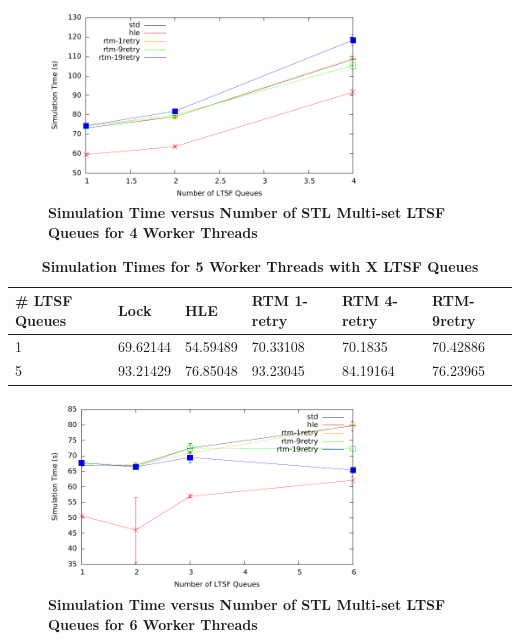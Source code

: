 \documentclass[11pt]{book}
\begin{document}
\begin{figure}[H]
    \centering
    \graphicspath{ {./figures/} }
    \includegraphics[width=0.75\textwidth,keepaspectratio]{noThrMig-hugeEpidemicSim-timeVSschedQs-multiset-4thread}
    \caption{\textbf{Simulation Time versus Number of STL Multi-set LTSF Queues
    for 4 Worker Threads}}
    \label{fig:noThrMig_timeVSschq_4threads}
\end{figure}

\begin{table}[H]
    \centering
    \begin{tabular}{l|p{2cm}|p{2cm}|p{2cm}|p{2cm}|p{2cm}}
        \textbf{\# LTSF Queues}&Lock &HLE &RTM 1-retry &RTM 4-retry &RTM-9retry \\
        \hline
        \midrule
            1 &69.62144  &54.59489 &70.33108  &70.1835  &70.42886 \\ 
            5 &93.21429  &76.85048 &93.23045  &84.19164 &76.23965 \\
    \end{tabular}
    \caption{\textbf{Simulation Times for 5 Worker Threads with X LTSF Queues}}
    \label{tab:noThrMig_5threadsXschq}
\end{table}

\begin{figure}[H]
    \centering
    \graphicspath{ {./figures/} }
    \includegraphics[width=0.75\textwidth,keepaspectratio]{noThrMig-hugeEpidemicSim-timeVSschedQs-multiset-6thread}
    \caption{\textbf{Simulation Time versus Number of STL Multi-set LTSF Queues
    for 6 Worker Threads}}
    \label{fig:noThrMig_timeVSschq_6threads}
\end{figure}
\end{document}
